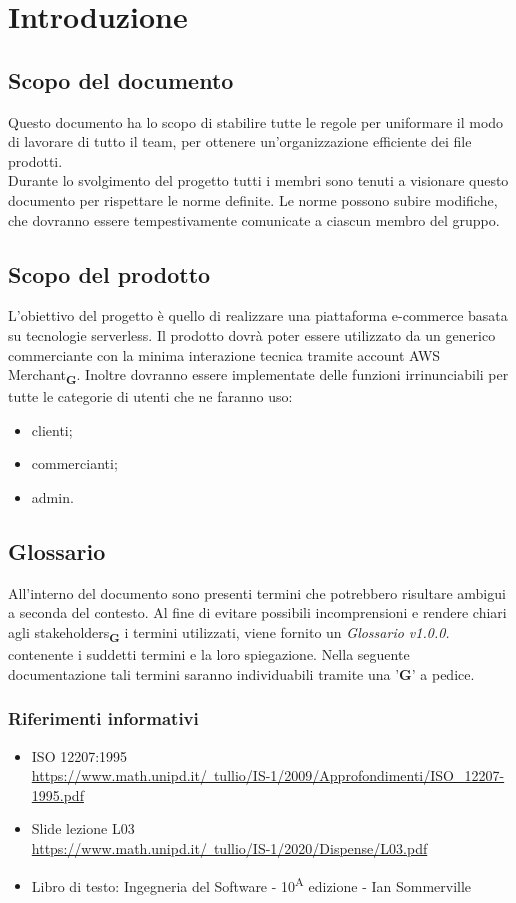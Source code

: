 \section{Introduzione}
\subsection{Scopo del documento}
Questo documento ha lo scopo di stabilire tutte le regole per uniformare il modo di lavorare di tutto il team, per ottenere un'organizzazione efficiente dei file prodotti.\\Durante lo svolgimento del progetto tutti i membri sono tenuti a visionare questo documento per rispettare le norme definite.
Le norme possono subire modifiche, che dovranno essere tempestivamente comunicate a ciascun membro del gruppo.

\subsection{Scopo del prodotto}
L'obiettivo del progetto è quello di realizzare una piattaforma e-commerce basata su tecnologie serverless. Il prodotto dovrà poter essere utilizzato da un generico commerciante con la minima interazione tecnica tramite account AWS Merchant\textsubscript{\textbf{G}}. Inoltre dovranno essere implementate delle funzioni irrinunciabili per tutte le categorie di utenti che ne faranno uso:
\begin{itemize}
    \item clienti;
    \item commercianti;
    \item admin.
\end{itemize}
\subsection{Glossario}
All'interno del documento sono presenti termini che potrebbero risultare ambigui a seconda del contesto. Al fine di evitare possibili incomprensioni
e rendere chiari agli stakeholders\textsubscript{\textbf{G}} i termini utilizzati, viene fornito un \textit{Glossario v1.0.0.} contenente i suddetti termini
e la loro spiegazione. Nella seguente documentazione tali termini saranno individuabili tramite una '\textbf{G}' a pedice.


\subsubsection{Riferimenti informativi}
\begin{itemize}
    \item ISO 12207:1995\\
          \href{https://www.math.unipd.it/~tullio/IS-1/2009/Approfondimenti/ISO\_12207-1995.pdf}{https://www.math.unipd.it/~tullio/IS-1/2009/Approfondimenti/ISO\_12207-1995.pdf}
    \item Slide lezione L03\\ \href{https://www.math.unipd.it/~tullio/IS-1/2020/Dispense/L03.pdf}{https://www.math.unipd.it/~tullio/IS-1/2020/Dispense/L03.pdf}
    \item Libro di testo: Ingegneria del Software - 10\textsuperscript{A} edizione - Ian Sommerville
\end{itemize}